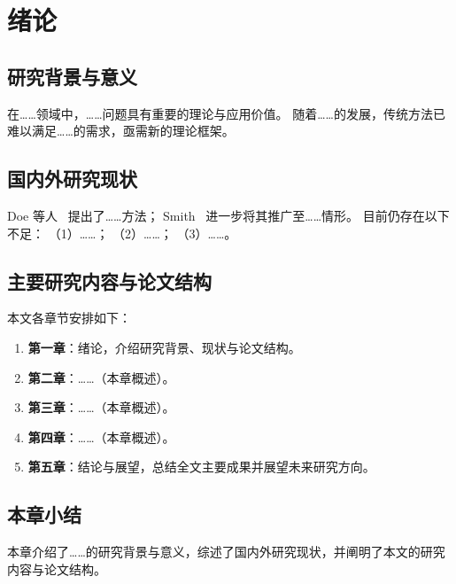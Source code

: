 \chapter{绪论}

\section{研究背景与意义}

在……领域中，……问题具有重要的理论与应用价值。
随着……的发展，传统方法已难以满足……的需求，亟需新的理论框架。

\section{国内外研究现状}

Doe 等人~\cite{doe2020} 提出了……方法；
Smith~\cite{smith2021} 进一步将其推广至……情形。
目前仍存在以下不足：
（1）……；
（2）……；
（3）……。

\section{主要研究内容与论文结构}

本文各章节安排如下：

\begin{enumerate}
  \item \textbf{第一章}：绪论，介绍研究背景、现状与论文结构。
  \item \textbf{第二章}：……（本章概述）。
  \item \textbf{第三章}：……（本章概述）。
  \item \textbf{第四章}：……（本章概述）。
  \item \textbf{第五章}：结论与展望，总结全文主要成果并展望未来研究方向。
\end{enumerate}

\section{本章小结}

本章介绍了……的研究背景与意义，综述了国内外研究现状，并阐明了本文的研究内容与论文结构。
